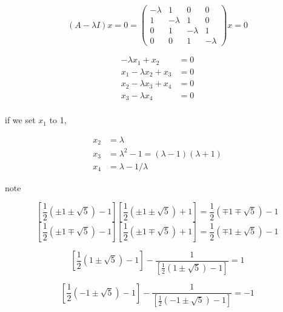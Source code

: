 \documentclass{article}
\begin{document}
\begin{enumerate}
  \begin{equation}
    (A-\lambda I)x=0 = \begin{pmatrix}
    -\lambda & 1 & 0 & 0 \\
    1 & -\lambda & 1 & 0 \\
    0 & 1 & -\lambda & 1 \\
    0 & 0 & 1 & -\lambda
    \end{pmatrix}
    x = 0
  \end{equation}
  
  \begin{equation}\begin{split}
  -\lambda x_1 + x_2 &= 0\\
  x_1 -\lambda x_2 + x_3 &= 0\\
  x_2 -\lambda x_3 + x_4 &= 0\\
  x_3 - \lambda x_4  &= 0\\
  \end{split}
  \end{equation}

  if we set \(x_1\) to 1, 

  \begin{equation}\begin{split}
      x_2 &= \lambda\\
      x_3 &= \lambda^2 - 1=(\lambda-1)(\lambda+1)\\
      x_4 &= \lambda - 1/\lambda
  \end{split}
  \end{equation}

  note

  \begin{equation}
    \left[\frac{1}{2}(\pm1 \pm \sqrt{5}) - 1\right] \left[\frac{1}{2}(\pm1 \pm \sqrt{5}) + 1\right] = \frac{1}{2}(\mp1 \mp \sqrt{5}) - 1
  \end{equation}
  \begin{equation}
    \left[\frac{1}{2}(\pm1 \mp \sqrt{5}) - 1\right] \left[\frac{1}{2}(\pm1 \mp \sqrt{5}) + 1\right] = \frac{1}{2}(\mp1 \pm \sqrt{5}) - 1
  \end{equation}

  \begin{equation}
    \left[\frac{1}{2}(1 \pm \sqrt{5}) - 1\right] - \frac{1}{\left[\frac{1}{2}(1 \pm \sqrt{5}) - 1\right]} = 1
  \end{equation}

  \begin{equation}
    \left[\frac{1}{2}(-1 \pm \sqrt{5}) - 1\right] - \frac{1}{\left[\frac{1}{2}(-1 \pm \sqrt{5}) - 1\right]} = -1
  \end{equation}


\end{enumerate}
\end{document}
